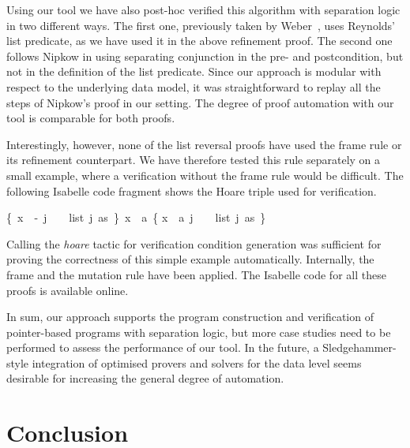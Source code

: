 \documentclass[twoside,runningheads,envcountsame,envcountsect,oribibl,orivec]{llncs}
\begin{document}
Using our tool we have also post-hoc verified this algorithm with
separation logic in two different ways. The first one, previously
taken by Weber~\cite{Weber04}, uses Reynolds' list predicate, as we
have used it in the above refinement proof. The second one follows
Nipkow in using separating conjunction in the pre- and postcondition,
but not in the definition of the list predicate. Since our approach is
modular with respect to the underlying data model, it was
straightforward to replay all the steps of Nipkow's proof in our
setting.  The degree of proof automation with our tool is comparable
for both proofs.

Interestingly, however, none of the list reversal proofs have used the
frame rule or its refinement counterpart. We have therefore tested
this rule separately on a small example, where a verification without
the frame rule would be difficult. The following Isabelle code fragment
shows the Hoare triple used for verification.

\begin{center}
\begin{isabellebody}
{\isachardoublequoteopen}{\isasymturnstile}\{\ x\ {\isacharbrackleft}{\isasymmapsto}{\isacharbrackright}\ {\isacharbrackleft}-{\isacharcomma}\ j{\isacharbrackright}\  \ {\isacharasterisk}\  \ list\ j\ as\  \}\ {\isacharat}x\ {\isacharcolon}{\isacharequal}\ a\ \{ x\ {\isacharbrackleft}{\isasymmapsto}{\isacharbrackright}\ {\isacharbrackleft}a{\isacharcomma}\ j{\isacharbrackright}\  \ {\isacharasterisk}\ \ list\ j\ as\  \} {\isachardoublequoteclose}
\end{isabellebody}
\end{center}
Calling the \emph{hoare} tactic for verification condition generation
was sufficient for proving the correctness of this simple example
automatically.  Internally, the frame and the mutation rule have been
applied.
The Isabelle code for all these proofs is available online.

In sum, our approach supports the program construction and
verification of pointer-based programs with separation logic, but more
case studies need to be performed to assess the performance of our
tool. In the future, a Sledgehammer-style integration of optimised
provers and solvers for the data level seems desirable for increasing
the general degree of automation.



\section{Conclusion}\label{S:conclusion}
\end{document}
